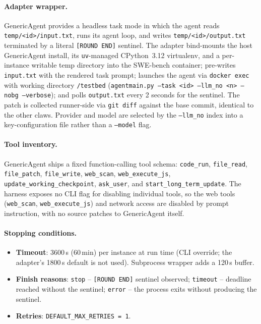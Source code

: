 \documentclass{llmxive}
\begin{document}
\paragraph{Adapter wrapper.}
GenericAgent provides a headless task mode in which the agent reads
\texttt{temp/<id>/input.txt}, runs its agent loop, and writes
\texttt{temp/<id>/output.txt} terminated by a literal \texttt{[ROUND END]}
sentinel. The adapter bind-mounts the host GenericAgent install, its
\texttt{uv}-managed CPython~3.12 virtualenv, and a per-instance writable temp
directory into the SWE-bench container; pre-writes \texttt{input.txt} with the
rendered task prompt; launches the agent via \texttt{docker exec} with working
directory \texttt{/testbed}
(\texttt{agentmain.py --task <id> --llm\_no <n> --nobg --verbose});
and polls \texttt{output.txt} every 2 seconds for the sentinel. The patch is
collected runner-side via \texttt{git diff} against the base commit, identical
to the other claws. Provider and model are selected by the \texttt{--llm\_no}
index into a key-configuration file rather than a \texttt{--model} flag.

\paragraph{Tool inventory.}
GenericAgent ships a fixed function-calling tool schema:
\texttt{code\_run}, \texttt{file\_read}, \texttt{file\_patch},
\texttt{file\_write}, \texttt{web\_scan}, \texttt{web\_execute\_js},
\texttt{update\_working\_checkpoint}, \texttt{ask\_user}, and
\texttt{start\_long\_term\_update}. The harness exposes no CLI flag for
disabling individual tools, so the web tools (\texttt{web\_scan},
\texttt{web\_execute\_js}) and network access are disabled by prompt
instruction, with no source patches to GenericAgent itself.

\paragraph{Stopping conditions.}
\begin{itemize}
  \item \textbf{Timeout}: 3600\,s (60\,min) per instance at run time (CLI
  override; the adapter's 1800\,s default is not used). Subprocess wrapper
  adds a 120\,s buffer.
  \item \textbf{Finish reasons}: \texttt{stop} -- \texttt{[ROUND END]}
  sentinel observed; \texttt{timeout} -- deadline reached without the
  sentinel; \texttt{error} -- the process exits without producing the
  sentinel.
  \item \textbf{Retries}: \texttt{DEFAULT\_MAX\_RETRIES = 1}.
\end{itemize}
\end{document}

